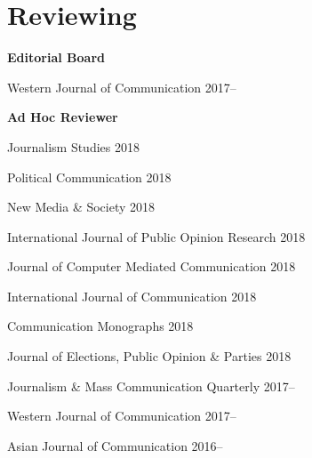 \section{Reviewing}

  \textbf{Editorial Board}
    \begin{innerlist}
      \item Western Journal of Communication                         \hfill 2017--
    \end{innerlist}\vspace{1em}

  \textbf{Ad Hoc Reviewer}
    \begin{innerlist}
      \item Journalism Studies                                       \hfill 2018
      \item Political Communication                                  \hfill 2018
      \item New Media \& Society                                     \hfill 2018
      \item International Journal of Public Opinion Research         \hfill 2018
      \item Journal of Computer Mediated Communication               \hfill 2018
      \item International Journal of Communication                   \hfill 2018
      \item Communication Monographs                                 \hfill 2018
      \item Journal of Elections, Public Opinion \& Parties          \hfill 2018
      \item Journalism \& Mass Communication Quarterly               \hfill 2017--
      \item Western Journal of Communication                         \hfill 2017--
      \item Asian Journal of Communication                           \hfill 2016--
    \end{innerlist}\vspace{-.075in}
